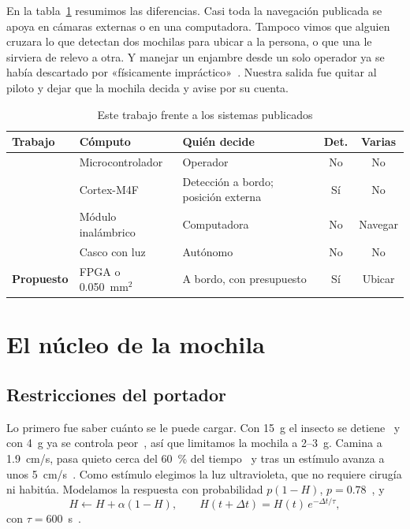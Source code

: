 \documentclass[conference,letterpaper,10pt]{IEEEtran}
\newcommand{\tabfont}{\footnotesize}
\begin{document}
En la tabla~\ref{tab:cmp} resumimos las diferencias. Casi toda la navegación publicada se apoya en cámaras externas o en una computadora. Tampoco vimos que alguien cruzara lo que detectan dos mochilas
para ubicar a la persona, o que una le sirviera de relevo a otra. Y manejar un enjambre desde un solo operador ya se había descartado por
«físicamente impráctico»~\cite{murphy2004}. Nuestra salida fue quitar al piloto y dejar que la mochila decida y avise por su cuenta.

\begin{table}[!tb]
\centering\tabfont
\caption{Este trabajo frente a los sistemas publicados}
\label{tab:cmp}
\begin{tabularx}{\columnwidth}{@{}l>{\raggedright\arraybackslash}X>{\raggedright\arraybackslash}Xcc@{}}
\toprule
Trabajo & Cómputo & Quién decide & Det. & Varias \\
\midrule
\cite{latif2012} & Microcontrolador & Operador & No & No \\
\cite{tranngoc2023} & Cortex-M4F & Detección a bordo; posición externa & Sí & No \\
\cite{bai2025} & Módulo inalámbrico & Computadora & No & Navegar \\
\cite{refat2025} & Casco con luz & Autónomo & No & No \\
\textbf{Propuesto} & FPGA o 0.050~mm$^2$ & A bordo, con presupuesto & Sí & Ubicar \\
\bottomrule
\end{tabularx}
\end{table}

\section{El núcleo de la mochila}

\subsection{Restricciones del portador}

Lo primero fue saber cuánto se le puede cargar. Con 15~g el insecto se detiene~\cite{montagut2024} y con 4~g ya se controla
peor~\cite{latif2012}, así que limitamos la mochila a 2--3~g. Camina a 1.9~cm/s, pasa quieto cerca del 60~\% del
tiempo~\cite{dirafzoon2017} y tras un estímulo avanza a unos 5~cm/s~\cite{tranngoc2024}. Como estímulo elegimos la luz ultravioleta,
que no requiere cirugía ni habitúa. Modelamos la respuesta con probabilidad $p(1-H)$, $p=0.78$~\cite{lin2023}, y
\begin{equation}
H\leftarrow H+\alpha(1-H),\qquad H(t+\Delta t)=H(t)\,e^{-\Delta t/\tau},
\end{equation}
con $\tau=600$~s~\cite{sanchez2015}.
\end{document}
